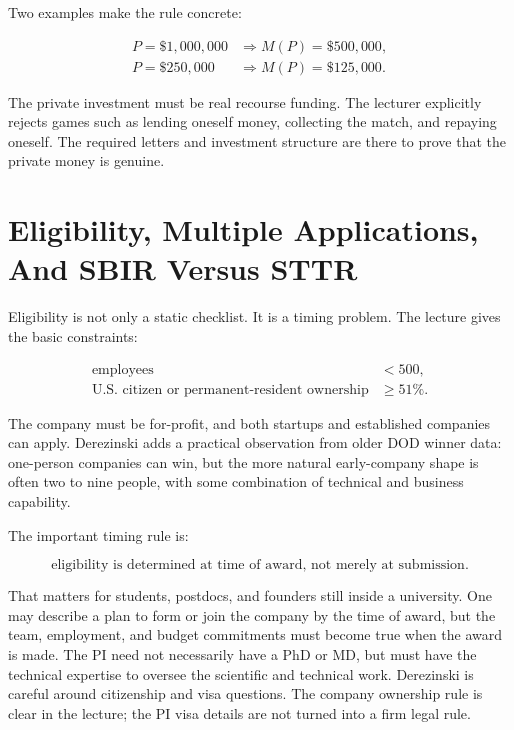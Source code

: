 Two examples make the rule concrete:

\begin{align}
P=\$1{,}000{,}000
&\Rightarrow
M(P)=\$500{,}000,\\
P=\$250{,}000
&\Rightarrow
M(P)=\$125{,}000.
\end{align}

The private investment must be real recourse funding. The lecturer explicitly rejects games such as lending oneself money, collecting the match, and repaying oneself. The required letters and investment structure are there to prove that the private money is genuine.

\section{Eligibility, Multiple Applications, And SBIR Versus STTR}

Eligibility is not only a static checklist. It is a timing problem. The lecture gives the basic constraints:

\begin{align}
\text{employees} &< 500,\\
\text{U.S. citizen or permanent-resident ownership} &\ge 51\%.
\end{align}

The company must be for-profit, and both startups and established companies can apply. Derezinski adds a practical observation from older DOD winner data: one-person companies can win, but the more natural early-company shape is often two to nine people, with some combination of technical and business capability.

The important timing rule is:

\begin{equation}
\text{eligibility is determined at time of award, not merely at submission.}
\end{equation}

That matters for students, postdocs, and founders still inside a university. One may describe a plan to form or join the company by the time of award, but the team, employment, and budget commitments must become true when the award is made. The PI need not necessarily have a PhD or MD, but must have the technical expertise to oversee the scientific and technical work. Derezinski is careful around citizenship and visa questions. The company ownership rule is clear in the lecture; the PI visa details are not turned into a firm legal rule.

